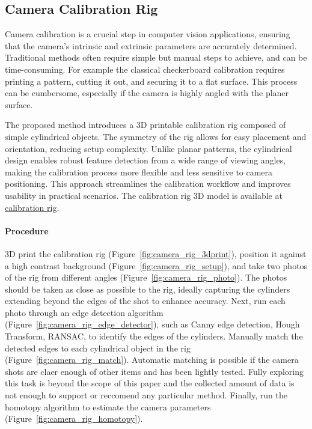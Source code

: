 \subsection{Camera Calibration Rig}
\label{sec:camera_calibration_rig}

Camera calibration is a crucial step in computer vision applications, ensuring that the camera's intrinsic and extrinsic parameters are accurately determined. Traditional methods often require simple but manual steps to achieve, and can be time-consuming. For example the classical checkerboard calibration requires printing a pattern, cutting it out, and securing it to a flat surface. This process can be cumbersome, especially if the camera is highly angled with the planer surface.

The proposed method introduces a 3D printable calibration rig composed of simple cylindrical objects. The symmetry of the rig allows for easy placement and orientation, reducing setup complexity. Unlike planar patterns, the cylindrical design enables robust feature detection from a wide range of viewing angles, making the calibration process more flexible and less sensitive to camera positioning. This approach streamlines the calibration workflow and improves usability in practical scenarios.
The calibration rig 3D model is available at \href{https://github.com/EnricoBarbieri1997/cylinder-based-homotopy-camera-calibration/assets/calibration_rig.stl}{calibration rig}.

\paragraph{Procedure}
3D print the calibration rig (Figure~\ref{fig:camera_rig_3dprint}), position it against a high contrast background (Figure~\ref{fig:camera_rig_setup}), and take two photos of the rig from different angles (Figure~\ref{fig:camera_rig_photo}).
The photos should be taken as close as possible to the rig, ideally capturing the cylinders extending beyond the edges of the shot to enhance accuracy.
Next, run each photo through an edge detection algorithm (Figure~\ref{fig:camera_rig_edge_detector}), such as Canny edge detection, Hough Transform, RANSAC, to identify the edges of the cylinders.
Manually match the detected edges to each cylindrical object in the rig (Figure~\ref{fig:camera_rig_match}).
Automatic matching is possible if the camera shots are claer enough of other items and has been lightly tested. Fully exploring this task is beyond the scope of this paper and the collected amount of data is not enough to support or reccomend any particular method.
Finally, run the homotopy algorithm to estimate the camera parameters (Figure~\ref{fig:camera_rig_homotopy}).

